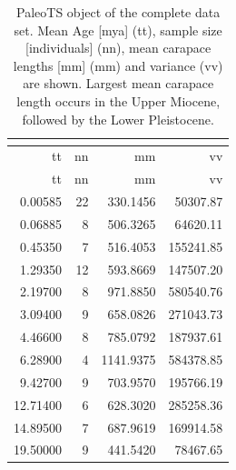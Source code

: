 
\begin{longtable}[]{@{}rrrr@{}}
	\caption[PaleoTS object of the complete dataset]{PaleoTS object of the complete data set. Mean Age [mya] (tt), sample size [individuals] (nn), mean carapace lengths [mm] (mm) and variance (vv) are shown. Largest mean carapace length occurs in the Upper Miocene, followed by the Lower Pleistocene.}
	\label{tab:pTSall}\tabularnewline
	\toprule
	tt & nn & mm & vv\tabularnewline
	\midrule
	\endfirsthead
	\toprule
	tt & nn & mm & vv\tabularnewline
	\midrule
	\endhead
	0.00585 & 22 & 330.1456 & 50307.87\tabularnewline
	0.06885 & 8 & 506.3265 & 64620.11\tabularnewline
	0.45350 & 7 & 516.4053 & 155241.85\tabularnewline
	1.29350 & 12 & 593.8669 & 147507.20\tabularnewline
	2.19700 & 8 & 971.8850 & 580540.76\tabularnewline
	3.09400 & 9 & 658.0826 & 271043.73\tabularnewline
	4.46600 & 8 & 785.0792 & 187937.61\tabularnewline
	6.28900 & 4 & 1141.9375 & 584378.85\tabularnewline
	9.42700 & 9 & 703.9570 & 195766.19\tabularnewline
	12.71400 & 6 & 628.3020 & 285258.36\tabularnewline
	14.89500 & 7 & 687.9619 & 169914.58\tabularnewline
	19.50000 & 9 & 441.5420 & 78467.65\tabularnewline
	\bottomrule
\end{longtable}



